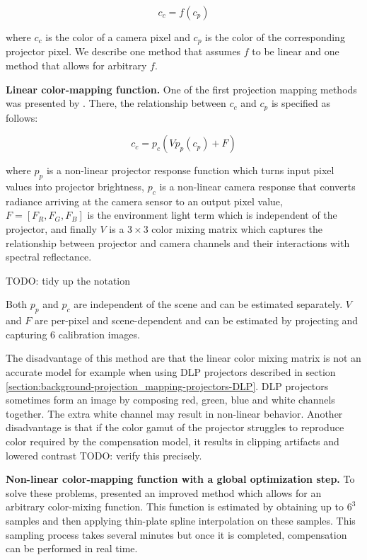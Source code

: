\begin{equation}
    \label{eq:radiometric_calibration}
    c_c = f(c_p)
\end{equation}

where \(c_c\) is the color of a camera pixel and \(c_p\) is the color of the corresponding projector pixel. We describe one method that assumes \(f\) to be linear and one method that allows for arbitrary \(f\).

\textbf{Linear color-mapping function.} One of the first projection mapping methods was presented by \citet{Grossberg2004}. There, the relationship between \(c_c\) and \(c_p\) is specified as follows:

\begin{equation}
    \label{eq:linear_color_mapping}
    c_c = p_c(V p_p(c_p) + F)
\end{equation}

where \(p_p\) is a non-linear projector response function which turns input pixel values into projector brightness, \(p_c\) is a non-linear camera response that converts radiance arriving at the camera sensor to an output pixel value, \(F = [F_R, F_G, F_B]\) is the environment light term which is independent of the projector, and finally \(V\) is a \(3 \times 3\) color mixing matrix which captures the relationship between projector and camera channels and their interactions with spectral reflectance.

{\color{red} TODO: tidy up the notation}

Both \(p_p\) and \(p_c\) are independent of the scene and can be estimated separately. \(V\) and \(F\) are per-pixel and scene-dependent and can be estimated by projecting and capturing 6 calibration images.

The disadvantage of this method are that the linear color mixing matrix is not an accurate model for example when using DLP projectors described in section \ref{section:background-projection_mapping-projectors-DLP}. DLP projectors sometimes form an image by composing red, green, blue and white channels together. The extra white channel may result in non-linear behavior. Another disadvantage is that if the color gamut of the projector struggles to reproduce color required by the compensation model, it results in clipping artifacts and lowered contrast {\color{red} TODO: verify this precisely}.

\textbf{Non-linear color-mapping function with a global optimization step.} To solve these problems, \citet{Grundhofer2015} presented an improved method which allows for an arbitrary color-mixing function. This function is estimated by obtaining up to \(6^3\) samples and then applying thin-plate spline interpolation on these samples. This sampling process takes several minutes but once it is completed, compensation can be performed in real time.

